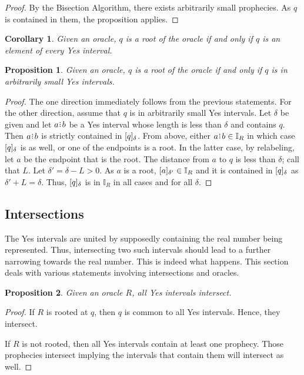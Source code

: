 \documentclass[12pt]{article}
\newtheorem{corollary}{Corollary}[section]
\newtheorem{proposition}{Proposition}[section]
\begin{document}
\begin{proof}
    By the Bisection Algorithm, there exists arbitrarily small prophecies. As $q$ is contained in them, the proposition applies. 
\end{proof}



\begin{corollary}
    Given an oracle, $q$ is a root of the oracle if and only if $q$ is an element of every Yes interval. 
\end{corollary}

\begin{proposition}
    Given an oracle, $q$ is a root of the oracle if and only if $q$ is in arbitrarily small Yes intervals. 
\end{proposition}

\begin{proof}
   The one direction immediately follows from the previous statements. For the other direction, assume that $q$ is in arbitrarily small Yes intervals. Let $\delta$ be given and let $a\rint b$ be a Yes interval whose length is less than $\delta$ and contains $q$. Then $a\rint b$ is strictly contained in $\halo{q}$. From above, either $a\rint b \in \mathbb{I}_R$ in which case $\halo{q}$ is as well, or one of the endpoints is a root. In the latter case, by relabeling, let $a$ be the endpoint that is the root. The distance from $a$ to $q$ is less than $\delta$; call that $L$. Let $\delta' = \delta - L > 0$. As $a$ is a root, $\halo[\delta']{a} \in \mathbb{I}_R$ and it is contained in $\halo{q}$ as $\delta' + L = \delta$. Thus, $\halo{q}$ is in $\mathbb{I}_R$ in all cases and for all $\delta$.
\end{proof}


\subsection{Intersections}

The Yes intervals are united by supposedly containing the real number being represented. Thus, intersecting two such intervals should lead to a further narrowing towards the real number. This is indeed what happens. This section deals with various statements involving intersections and oracles. 


\begin{proposition}\label{os-yesinter}
    Given an oracle $R$, all Yes intervals intersect. 
\end{proposition}

\begin{proof}
    If $R$ is rooted at $q$, then $q$ is common to all Yes intervals. Hence, they intersect. 

    If $R$ is not rooted, then all Yes intervals contain at least one prophecy. Those prophecies intersect implying the intervals that contain them will intersect as well. 
\end{proof}
\end{document}
